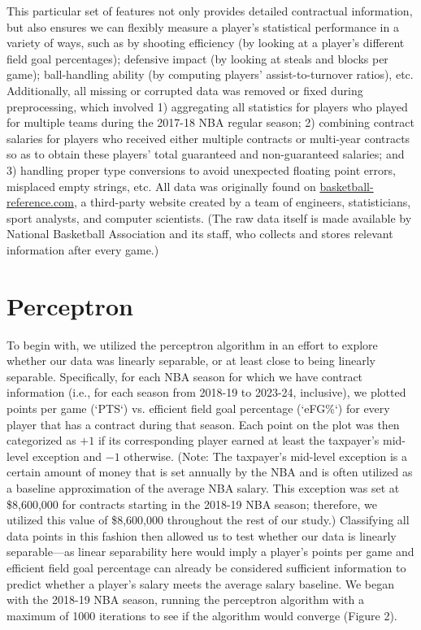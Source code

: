 \documentclass{article}
\begin{document}
This particular set of features not only provides detailed contractual information, but also ensures we can flexibly measure a player's statistical performance in a variety of ways, such as by shooting efficiency (by looking at a player's different field goal percentages); defensive impact (by looking at steals and blocks per game); ball-handling ability (by computing players' assist-to-turnover ratios), etc. Additionally, all missing or corrupted data was removed or fixed during preprocessing, which involved 1) aggregating all statistics for players who played for multiple teams during the 2017-18 NBA regular season; 2) combining contract salaries for players who received either multiple contracts or multi-year contracts so as to obtain these players' total guaranteed and non-guaranteed salaries; and 3) handling proper type conversions to avoid unexpected floating point errors, misplaced empty strings, etc.
All data was originally found on \url{basketball-reference.com}, a third-party website created by a team of engineers, statisticians, sport analysts, and computer scientists. (The raw data itself is made available by National Basketball Association and its staff, who collects and stores relevant information after every game.)


\section{Perceptron}
To begin with, we utilized the perceptron algorithm in an effort to explore whether our data was linearly separable, or at least close to being linearly separable. Specifically, for each NBA season for which we have contract information (i.e., for each season from 2018-19 to 2023-24, inclusive), we plotted points per game (`PTS`) vs. efficient field goal percentage (`eFG\%`) for every player that has a contract during that season. Each point on the plot was then categorized as $+1$ if its corresponding player earned at least the taxpayer's mid-level exception and $-1$ otherwise. (Note: The taxpayer's mid-level exception is a certain amount of money that is set annually by the NBA and is often utilized as a baseline approximation of the average NBA salary. This exception was set at \$8,600,000 for contracts starting in the 2018-19 NBA season; therefore, we utilized this value of \$8,600,000 throughout the rest of our study.) Classifying all data points in this fashion then allowed us to test whether our data is linearly separable—as linear separability here would imply a player's points per game and efficient field goal percentage can already be considered sufficient information to predict whether a player's salary meets the average salary baseline. We began with the 2018-19 NBA season, running the perceptron algorithm with a maximum of 1000 iterations to see if the algorithm would converge (Figure 2).
\end{document}
